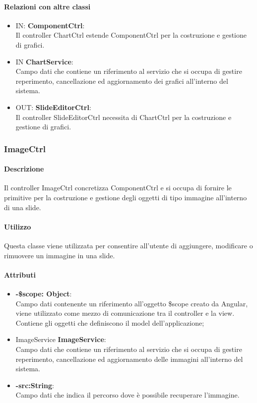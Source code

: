 	\paragraph{Relazioni con altre classi}
	\begin{itemize}
 	\item IN: \textbf{ComponentCtrl}:\\
	 	Il controller ChartCtrl estende ComponentCtrl per la costruzione e gestione di grafici.
	\item IN \textbf{ChartService}:\\
		Campo dati che contiene un riferimento al servizio che si occupa di gestire reperimento, cancellazione ed aggiornamento dei grafici all'interno del sistema.
 	\item OUT: \textbf{SlideEditorCtrl}:\\
	 	Il controller SlideEditorCtrl necessita di ChartCtrl per la costruzione e gestione di grafici.
	\end{itemize}

\newpage
\subsubsection{ImageCtrl}
   \paragraph{Descrizione}
	Il controller ImageCtrl concretizza ComponentCtrl e si occupa di fornire le primitive per la costruzione e gestione degli oggetti di tipo immagine all'interno di una slide.
		
	\paragraph{Utilizzo}
	Questa classe viene utilizzata per consentire all'utente di aggiungere, modificare o rimuovere un immagine in una slide.
	
	\paragraph{Attributi}
	\begin{itemize}
		\item \textbf{-\$scope: Object}:\\
			Campo dati contenente un riferimento all'oggetto \$scope creato da Angular, viene utilizzato come mezzo di comunicazione tra il controller e la view. Contiene gli oggetti che definiscono il model dell'applicazione;
		\item ImageService \textbf{ImageService}:\\
			Campo dati che contiene un riferimento al servizio che si occupa di gestire reperimento, cancellazione ed aggiornamento delle immagini all'interno del sistema.
		\item\textbf{-src:String}:\\
			Campo dati che indica il percorso dove è possibile recuperare l'immagine.
	\end{itemize}
	
